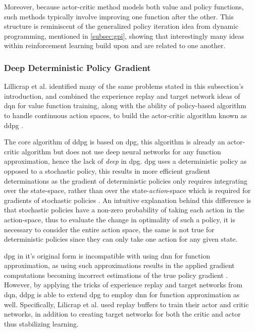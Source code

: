 \documentclass[../report.tex]{subfiles}
\begin{document}
Moreover, because actor-critic method models both value and policy functions, such methods typically involve improving one function after the other. This structure is reminiscent of the generalized policy iteration idea from dynamic programming, mentioned in \autoref{subsec:gpi}, showing that interestingly many ideas within reinforcement learning build upon and are related to one another.

\subsubsection{Deep Deterministic Policy Gradient}

Lillicrap et al. identified many of the same problems stated in this subsection's introduction, and combined the experience replay and target network ideas of \ac{dqn} for value function training, along with the ability of policy-based algorithm to handle continuous action spaces, to build the actor-critic algorithm known as \ac{ddpg} \cite{ddpg}.

The core algorithm of \ac{ddpg} is based on \ac{dpg}, this algorithm is already an actor-critic algorithm but does not use deep neural networks for any function approximation, hence the lack of \textit{deep} in \ac{dpg}. \ac{dpg} uses a deterministic policy as opposed to a stochastic policy, this results in more efficient gradient determinations as the gradient of deterministic policies only requires integrating over the state-space, rather than over the state-\textit{action}-space which is required for gradients of stochastic policies \cite{dpg}. An intuitive explanation behind this difference is that stochastic policies have a non-zero probability of taking each action in the action-space, thus to evaluate the change in optimality of such a policy, it is necessary to consider the entire action space, the same is not true for deterministic policies since they can only take one action for any given state.

\ac{dpg} in it's original form is incompatible with using \ac{dnn} for function approximation, as using such approximations results in the applied gradient computations becoming incorrect estimations of the true policy gradient \cite{dpg}. However, by applying the tricks of experience replay and target networks from \ac{dqn}, \ac{ddpg} is able to extend \ac{dpg} to employ \ac{dnn} for function approximation as well. Specifically, Lilicrap et al. used replay buffers to train their actor and critic networks, in addition to creating target networks for both the critic and actor thus stabilizing learning.
\end{document}
